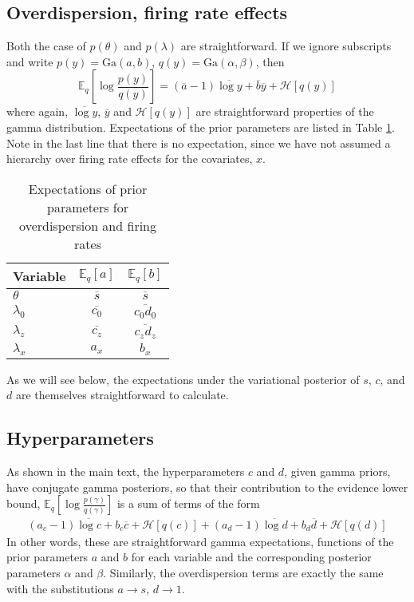 \documentclass{article} %
\begin{document}
\subsection{Overdispersion, firing rate effects}
Both the case of $p(\theta)$ and $p(\lambda)$ are straightforward. If we ignore subscripts and write $p(y) = \text{Ga}(a, b)$, $q(y) = \text{Ga}(\alpha, \beta)$, then
\begin{equation}
    \mathbb{E}_q \left[\log \frac{p(y)}{q(y)} \right] =
    (\overline{a} - 1) \overline{\log y} + \overline{b} \overline{y} + \mathcal{H}[q(y)]
\end{equation}
where again, $\overline{\log y}$, $\overline{y}$ and $\mathcal{H}[q(y)]$ are straightforward properties of the gamma distribution. Expectations of the prior parameters are listed in Table \ref{expectation_table}. Note in the last line that there is no expectation, since we have not assumed a hierarchy over firing rate effects for the covariates, $x$.
\begin{table}[ht]
\caption{Expectations of prior parameters for overdispersion and firing rates}
\label{expectation_table}
\begin{center}
\begin{tabular}{lcc}
\multicolumn{1}{c}{\bf Variable}  &\multicolumn{1}{c}{\bf $\mathbb{E}_q[a]$} &\multicolumn{1}{c}{\bf $\mathbb{E}_q[b]$}
\\ \hline
$\theta$ &$\overline{s}$ &$\overline{s}$ \\
$\lambda_0$ &$\overline{c_0}$ &$\overline{c_0 d_0}$ \\
$\lambda_z$ &$\overline{c_z}$ &$\overline{c_z d_z}$ \\
$\lambda_x$ &$a_x$ &$b_x$ \\
\end{tabular}
\end{center}
\end{table}
As we will see below, the expectations under the variational posterior of $s$, $c$, and $d$ are themselves straightforward to calculate.

\subsection{Hyperparameters}
As shown in the main text, the hyperparameters $c$ and $d$, given gamma priors, have conjugate gamma posteriors, so that their contribution to the evidence lower bound, $\mathbb{E}_q \left[\log \frac{p(\gamma)}{q(\gamma)} \right]$ is a sum of terms of the form
\begin{align}
    (a_{c} - 1) \overline{\log c} + b_{c} \overline{c} + \mathcal{H}[q(c)] +
    (a_{d} - 1) \overline{\log d} + b_{d} \overline{d} + \mathcal{H}[q(d)]
\end{align}
In other words, these are straightforward gamma expectations, functions of the prior parameters $a$ and $b$ for each variable and the corresponding posterior parameters $\alpha$ and $\beta$. Similarly, the overdispersion terms are exactly the same with the substitutions $a \rightarrow s$, $d\rightarrow 1$.
\end{document}
